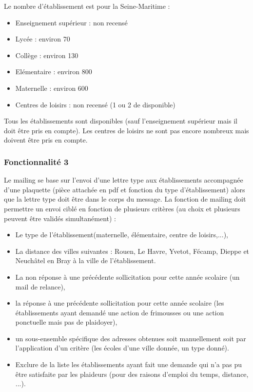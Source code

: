 Le nombre d'établissement est pour la Seine-Maritime :
\begin{itemize}
\item Enseignement supérieur : non recensé \\
\item Lycée : environ 70 \\
\item Collège : environ 130 \\
\item Elémentaire : environ 800 \\
\item Maternelle : environ 600 \\
\item Centres de loisirs : non recensé (1 ou 2 de disponible) \\
\end{itemize}

Tous les établissements sont disponibles (sauf l'enseignement supérieur mais il doit être pris en compte). Les centres de loisirs ne sont pas encore nombreux mais doivent être pris en compte.\\

\subsubsection{Fonctionnalité 3}
Le mailing se base sur l'envoi d'une lettre type aux établissements
accompagnée d'une plaquette (pièce attachée en pdf et fonction du type d'établissement) alors que la lettre type doit être dans le corps du message. La fonction de mailing doit permettre un envoi ciblé en fonction de plusieurs critères (au choix et plusieurs peuvent être validés simultanément) :
\begin{itemize}
\item Le type de l'établissement(maternelle, élémentaire, centre de loisirs,...), \\
\item La distance des villes suivantes : Rouen, Le Havre, Yvetot, Fécamp, Dieppe et Neuchâtel en Bray à la ville de l'établissement. \\
\item La non réponse à une précédente sollicitation pour cette année scolaire (un mail de relance),
\\
\item la réponse à une précédente sollicitation pour cette année scolaire (les établissements ayant
demandé une action de frimousses ou une action ponctuelle mais pas de plaidoyer), \\
\item un sous-ensemble spécifique des adresses obtenues soit manuellement soit par l'application
d'un critère (les écoles d'une ville donnée, un type donné). \\
\item Exclure de la liste les établissements ayant fait une demande qui n'a pas pu être satisfaite par
les plaideurs (pour des raisons d'emploi du temps, distance, ...). \\
\end{itemize}

